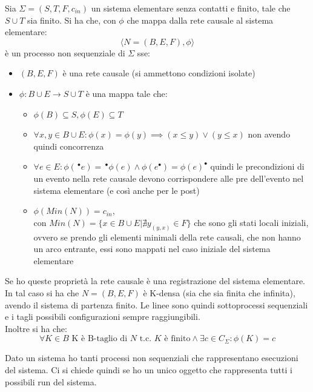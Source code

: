 \documentclass[a4paper,12pt, oneside]{book}
\begin{document}
\begin{definizione}
  Sia $\Sigma=(S,T,F,c_{in})$ un sistema elementare senza contatti e finito,
  tale che $S\cup T$ sia finito. Si ha che, con $\phi$ che mappa dalla rete
  causale al sistema elementare: 
  \[\langle N=(B,E,F), \phi\rangle\]
  è un processo non sequenziale di $\Sigma$ sse:
  \begin{itemize}
    \item $(B,E,F)$ è una rete causale (si ammettono condizioni isolate)
    \item $\phi:B\cup E\to S\cup T$ è una mappa tale che:
    \begin{itemize}
      \item $\phi(B)\subseteq S, \phi(E)\subseteq T$
      \item $\forall x,y\in B\cup E:\phi(x)=\phi(y)\implies (x\leq y)\lor (y\leq
      x)$ non avendo quindi concorrenza
      \item $\forall e\in E:\phi(\,^\bullet e)=\,^\bullet
      \phi(e)\land\phi(e^\bullet)=\phi(e)^\bullet$ quindi le precondizioni di un
      evento nella rete causale devono corrispondere alle pre dell'evento nel
      sistema elementare (e così anche per le post)
      \item $\phi(Min(N))=c_{in}$,\\ con $Min(N)=\{x\in B\cup E|\nexists
      y_(y,x)\in F\}$ che sono gli stati locali iniziali, ovvero se prendo gli
      elementi minimali della rete 
      causali, che non hanno un arco entrante, essi sono mappati nel caso
      iniziale del sistema elementare
    \end{itemize}
  \end{itemize}
  Se ho queste proprietà la rete causale è una registrazione del sistema
  elementare.\\
  In tal caso si ha che $N=(B,E,F)$ è K-densa (sia che sia finita che infinita),
  avendo il sistema di partenza finito. Le linee sono quindi sottoprocessi
  sequenziali e i tagli possibili configurazioni sempre raggiungibili.\\
  Inoltre si ha che:
  \[\forall K\in B\mbox{ K è B-taglio di } N \mbox{ t.c. } K \mbox{ è finito}
    \land \exists c\in C_\Sigma:\phi(K)=c\]
\end{definizione}
Dato un sistema ho tanti processi non sequenziali che rappresentano esecuzioni
del sistema. Ci si chiede quindi se ho un unico oggetto che rappresenta tutti i
possibili run del sistema.
\end{document}
